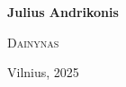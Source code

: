 \thispagestyle{empty}
\begin{center}
    \null
    \textbf{Julius Andrikonis}
        
    \Large\textsc{Dainynas}\normalsize
        
    Vilnius, 2025
\end{center}
\cleardoublepage
